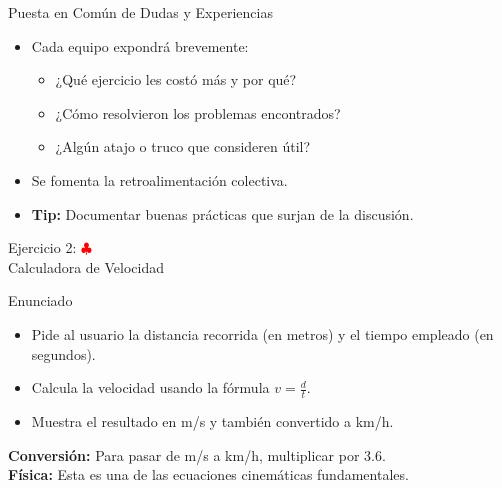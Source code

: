 \documentclass[10pt]{beamer}
\begin{document}
\begin{frame}{Puesta en Común de Dudas y Experiencias}
  \begin{itemize}
    \item Cada equipo expondrá brevemente:
      \begin{itemize}
        \item ¿Qué ejercicio les costó más y por qué?
        \item ¿Cómo resolvieron los problemas encontrados?
        \item ¿Algún atajo o truco que consideren útil?
      \end{itemize}
    \item Se fomenta la retroalimentación colectiva.
    \item \textbf{Tip:} Documentar buenas prácticas que surjan de la discusión.
  \end{itemize}
\end{frame}


\begin{frame}{Ejercicio 2: \hfill \textcolor{red}{$\clubsuit$}\\ Calculadora de Velocidad}
  \begin{block}{Enunciado}
    \begin{itemize}
      \item Pide al usuario la distancia recorrida (en metros) y el tiempo empleado (en segundos).
      \item Calcula la velocidad usando la fórmula \(v = \frac{d}{t}\).
      \item Muestra el resultado en m/s y también convertido a km/h.
    \end{itemize}
  \end{block}
  \textbf{Conversión:} Para pasar de m/s a km/h, multiplicar por 3.6.
  \\
  \textbf{Física:} Esta es una de las ecuaciones cinemáticas fundamentales.
\end{frame}
\end{document}
